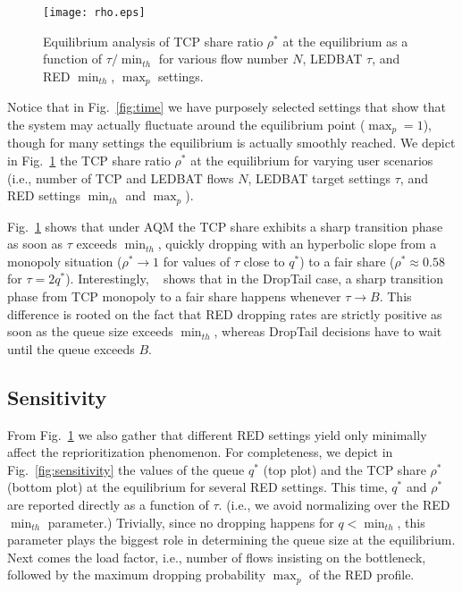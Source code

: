 \documentclass[conference]{IEEEtran}
\newcommand{\secL}[1]{\label{sec:#1}}
\newcommand{\figR}[1]{Fig.~\ref{fig:#1}}
\newcommand{\figLC}[2]{
		\caption{#2}
		\label{fig:#1}
}
\begin{document}
\begin{figure}[t]
    \begin{center}
        \texttt{[image: rho.eps]}
        \figLC{rho}{Equilibrium analysis of TCP share ratio $\rho^*$ at the equilibrium as a function of $\tau/\min_{th}$ for various flow number $N$, LEDBAT $\tau$, and RED $\min_{th}$, $\max_p$ settings.}
    \end{center}
\end{figure}


Notice that in \figR{time} we have purposely selected settings that show that the system may actually fluctuate around the equilibrium point ($\max_p=1$), though for many settings the equilibrium is actually smoothly reached.
We depict in \figR{rho} the TCP share ratio $\rho^*$ at the equilibrium for varying user scenarios (i.e., number of TCP and LEDBAT flows $N$, LEDBAT target settings $\tau$,  and RED settings $\min_{th}$ and $\max_p$). 

\figR{rho} shows that  under AQM the TCP share exhibits a sharp transition phase as soon as  $\tau$ exceeds $\min_{th}$, quickly dropping with an hyperbolic slope from a monopoly situation ($\rho^* \rightarrow 1 $ for values of $\tau$ close to $q^*$) to a fair share ($\rho^* \approx 0.58 $ for  $\tau = 2q^*$). 
Interestingly, ~\cite{lcn10} shows that in the DropTail case, a sharp transition phase from TCP monopoly to a fair share happens whenever $\tau \rightarrow B$.
This difference is rooted on the fact that RED dropping rates are strictly positive as soon as the queue size exceeds $\min_{th}$, whereas DropTail decisions have to wait until the queue exceeds $B$. 


\subsection{Sensitivity}\secL{sensitivity}

From \figR{rho} we also gather that different RED settings yield only minimally affect the reprioritization phenomenon. For completeness, we depict in \figR{sensitivity} the values of the queue $q^*$ (top plot) and the TCP share  $\rho^*$ (bottom plot) at the equilibrium for several RED settings. This time, $q^*$ and $\rho^*$ are reported directly as a function of $\tau$. (i.e., we avoid normalizing over the RED $\min_{th}$ parameter.) 
Trivially, since no dropping happens for $q<\min_{th}$, this parameter plays the biggest role in determining the queue size at the equilibrium. Next comes the load factor, i.e., number of flows insisting on the bottleneck, followed by the maximum dropping probability $\max_{p}$ of the RED profile. 
\end{document}
